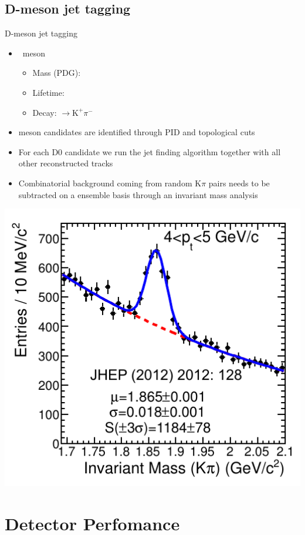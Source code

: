 \documentclass{beamer}
\begin{document}
\subsection{D-meson jet tagging}
\begin{frame}{D-meson jet tagging}
\begin{itemize}
\item \Dzero\ meson
\begin{itemize}
\item Mass (PDG): 
\item Lifetime: 
\item Decay: \Dzero$\rightarrow\mathrm{K}^+\pi^-$
\end{itemize}
\item \Dzero\-meson candidates are identified through PID and topological cuts
\item For each D0 candidate we run the jet finding algorithm together with all other reconstructed tracks
\item Combinatorial background coming from random $\mathrm{K}\pi$ pairs needs to be subtracted on a ensemble basis through an invariant mass analysis
\end{itemize}
\includegraphics[width=.3\paperwidth]{img/ALICE_D0InvMass}
\end{frame}

\section{Detector Perfomance}
\end{document}
